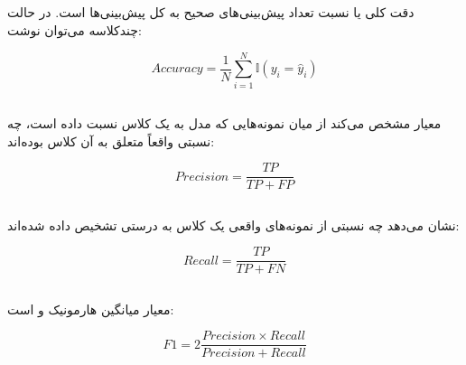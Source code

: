 \documentclass[12pt,a4paper,oneside]{report}
\begin{document}
\subsection{}

دقت کلی یا
نسبت تعداد پیش‌بینی‌های صحیح به کل پیش‌بینی‌ها است. در حالت چندکلاسه می‌توان نوشت:

\begin{equation}
Accuracy
=
\frac{1}{N}
\sum_{i=1}^{N}
\mathbb{I}(y_i=\hat{y}_i)
\end{equation}


\subsection{}

معیار
مشخص می‌کند از میان نمونه‌هایی که مدل به یک کلاس نسبت داده است، چه نسبتی واقعاً متعلق به آن کلاس بوده‌اند:

\begin{equation}
Precision
=
\frac{TP}{TP+FP}
\end{equation}


\subsection{}

نشان می‌دهد چه نسبتی از نمونه‌های واقعی یک کلاس به درستی تشخیص داده شده‌اند:

\begin{equation}
Recall
=
\frac{TP}{TP+FN}
\end{equation}


\subsection{}

معیار
میانگین هارمونیک
و
است:

\begin{equation}
F1
=
2
\frac{
Precision
\times
Recall
}{
Precision+Recall
}
\end{equation}
\end{document}
